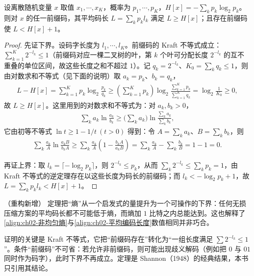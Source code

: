 \documentclass[../../main.tex]{subfiles}
\begin{document}
\begin{theorem}[无噪编码定理]\label{theorem:ch02-无噪编码定理}
设离散随机变量 $x$ 取值 $x_1,\cdots,x_K$，概率为 $p_1,\cdots,p_K$，$H[x]=-\sum_k p_k\log_2p_k$。则对 $x$ 的任一前缀码，其平均码长 $L=\sum_k p_k l_k$ 满足 $L\geqslant H[x]$；且存在前缀码使 $L<H[x]+1$。
\end{theorem}

\begin{proof}
先证下界。设码字长度为 $l_1,\cdots,l_K$。前缀码的 Kraft 不等式成立：$\sum_{k=1}^{K}2^{-l_k}\leqslant1$（前缀码对应一棵二叉树的叶，第 $k$ 个叶可分配长度 $2^{-l_k}$ 的互不重叠的单位区间，故这些长度之和不超过 $1$）。记 $q_k=2^{-l_k}$、$K_0=\sum_kq_k\leqslant1$，则由对数求和不等式（见下面的说明）取 $a_k=p_k$、$b_k=q_k$，
\begin{align*}
  L - H[x] = \sum_{k=1}^{K}p_k\log_2\frac{p_k}{q_k}
  \geqslant \left(\sum_{k=1}^{K}p_k\right)\log_2\frac{\sum_{k=1}^{K}p_k}{\sum_{k=1}^{K}q_k}
  = \log_2\frac{1}{K_0} \geqslant 0 ,
\end{align*}
故 $L\geqslant H[x]$。这里用到的对数求和不等式为：对 $a_k,b_k>0$，
\begin{align*}
  \sum_k a_k\ln\frac{a_k}{b_k} \geqslant \Big(\sum_k a_k\Big)\ln\frac{\sum_k a_k}{\sum_k b_k} ,
\end{align*}
它由初等不等式 $\ln t\geqslant1-1/t\ (t>0)$ 得到：令 $A=\sum_ka_k$、$B=\sum_kb_k$，则
\begin{align*}
  \sum_k\frac{a_k}{A}\ln\frac{a_kB}{b_kA}
  \geqslant \sum_k\frac{a_k}{A}\left(1-\frac{b_kA}{a_kB}\right)
  = \sum_k\frac{a_k}{A} - \sum_k\frac{b_k}{B} = 1-1 = 0 .
\end{align*}

再证上界：取 $l_k=\lceil-\log_2p_k\rceil$，则 $2^{-l_k}\leqslant p_k$，从而 $\sum_k2^{-l_k}\leqslant\sum_kp_k=1$，由 Kraft 不等式的逆定理存在以这些长度为码长的前缀码；而 $l_k<-\log_2p_k+1$，故 $L=\sum_kp_kl_k<H[x]+1$。
\end{proof}

\begin{remark}（重构新增）
定理把“熵”从一个启发式的量提升为一个可操作的下界：任何无损压缩方案的平均码长都不可能低于熵，而熵加 $1$ 比特之内总能达到。这也解释了\eqref{align:ch02-非均匀熵}与\eqref{align:ch02-平均编码长度}数值相同并非巧合。

证明的关键是 Kraft 不等式，它把“前缀码存在”转化为“一组长度满足 $\sum2^{-l_k}\leqslant1$”。条件“前缀码”不可省：若允许非前缀码，则可能出现歧义解码（例如把 $0$ 与 $01$ 同时作为码字），此时下界不再成立。定理是 Shannon（1948）的经典结果，本书只引用其结论。
\end{remark}
\end{document}
